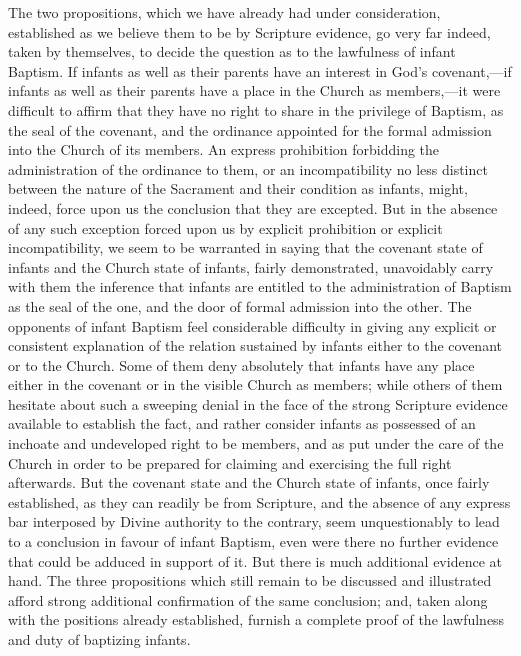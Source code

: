 \documentclass[]{book}
\begin{document}
The two propositions, which we have already had under consideration, established as we believe them to be by Scripture evidence, go very far indeed, taken by themselves, to decide the question as to the lawfulness of infant Baptism. If infants as well as their parents have an interest in God's covenant,---if infants as well as their parents have a place in the Church as members,---it were difficult to affirm that they have no right to share in the privilege of Baptism, as the seal of the covenant, and the ordinance appointed for the formal admission into the Church of its members. An express prohibition forbidding the administration of the ordinance to them, or an incompatibility no less distinct between the nature of the Sacrament and their condition as infants, might, indeed, force upon us the conclusion that they are excepted. But in the absence of any such exception forced upon us by explicit prohibition or explicit incompatibility, we seem to be warranted in saying that the covenant state of infants and the Church state of infants, fairly demonstrated, unavoidably carry with them the inference that infants are entitled to the administration of Baptism as the seal of the one, and the door of formal admission into the other. The opponents of infant Baptism feel considerable difficulty in giving any explicit or consistent explanation of the relation sustained by infants either to the covenant or to the Church. Some of them deny absolutely that infants have any place either in the covenant or in the visible Church as members; while others of them hesitate about such a sweeping denial in the face of the strong Scripture evidence available to establish the fact, and rather consider infants as possessed of an inchoate and undeveloped right to be members, and as put under the care of the Church in order to be prepared for claiming and exercising the full right afterwards. But the covenant state and the Church state of infants, once fairly established, as they can readily be from Scripture, and the absence of any express bar interposed by Divine authority to the contrary, seem unquestionably to lead to a conclusion in favour of infant Baptism, even were there no further evidence that could be adduced in support of it. But there is much additional evidence at hand. The three propositions which still remain to be discussed and illustrated afford strong additional confirmation of the same conclusion; and, taken along with the positions already established, furnish a complete proof of the lawfulness and duty of baptizing infants.
\end{document}
